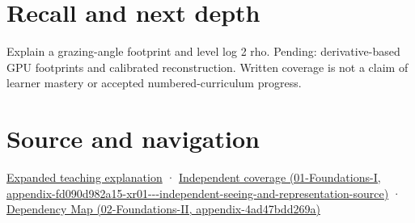 \section{Recall and next depth}\label{appendix-b677a85ba76f-recall-and-next-depth}

Explain a grazing-angle footprint and level log 2 rho. Pending: derivative-based GPU footprints and calibrated reconstruction. Written coverage is not a claim of learner mastery or accepted numbered-curriculum progress.

\section{Source and navigation}\label{appendix-b677a85ba76f-source-and-navigation}

\href{Continuous\%20Notes/University\%20-\%20Worlds,\%20Images\%20and\%20Inference\%20-\%20Graphics,\%20Vision\%20and\%20Photography\#Multiresolution\%20work\%20must\%20preserve\%20the\%20right\%20information}{Expanded teaching explanation} · \href{../01-Foundations-I/main.pdf\#nameddest=appendix-fd090d982a15-xr01---independent-seeing-and-representation-source}{Independent coverage (01-Foundations-I, appendix-fd090d982a15-xr01-\/-\/-independent-seeing-and-representation-source)} · \href{../02-Foundations-II/main.pdf\#nameddest=appendix-4ad47bdd269a}{Dependency Map (02-Foundations-II, appendix-4ad47bdd269a)}
